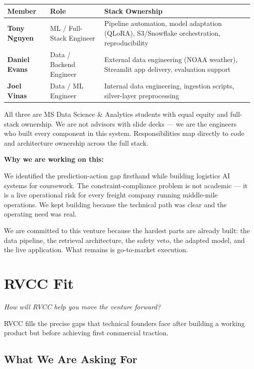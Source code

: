 \documentclass[11pt,letterpaper]{article}
\begin{document}
\vspace{0.3em}
\begin{tabular}{@{}L{3.5cm}L{4.5cm}L{6cm}@{}}
    \toprule
    \textbf{Member} & \textbf{Role} & \textbf{Stack Ownership} \\
    \midrule
    \textbf{Tony Nguyen} & ML / Full-Stack Engineer & Pipeline automation, model adaptation (QLoRA), S3/Snowflake orchestration, reproducibility \\[0.4em]
    \textbf{Daniel Evans} & Data / Backend Engineer & External data engineering (NOAA weather), Streamlit app delivery, evaluation support \\[0.4em]
    \textbf{Joel Vinas} & Data / ML Engineer & Internal data engineering, ingestion scripts, silver-layer preprocessing \\
    \bottomrule
\end{tabular}
\vspace{0.5em}

All three are MS Data Science \& Analytics students with equal equity and full-stack ownership. We are not advisors with slide decks --- we are the engineers who built every component in this system. Responsibilities map directly to code and architecture ownership across the full stack.

\textbf{Why we are working on this:}

We identified the prediction-action gap firsthand while building logistics AI systems for coursework. The constraint-compliance problem is not academic --- it is a live operational risk for every freight company running middle-mile operations. We kept building because the technical path was clear and the operating need was real.

We are committed to this venture because the hardest parts are already built: the data pipeline, the retrieval architecture, the safety veto, the adapted model, and the live application. What remains is go-to-market execution.

\section{RVCC Fit}
\textit{How will RVCC help you move the venture forward?}

\medskip
RVCC fills the precise gaps that technical founders face after building a working product but before achieving first commercial traction.

\subsection*{What We Are Asking For}
\end{document}
